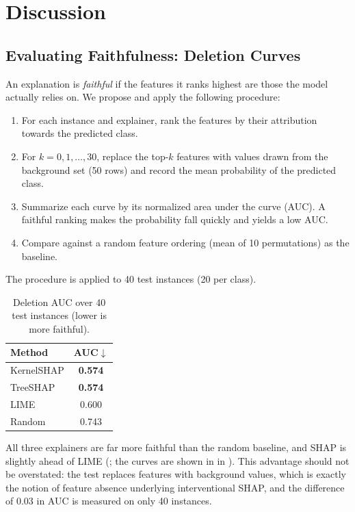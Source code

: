 \section{Discussion}
\label{sec:critical-analysis}

\subsection{Evaluating Faithfulness: Deletion Curves}
\label{sec:faithfulness}

An explanation is \textit{faithful} if the features it ranks highest are those the model actually relies on. We propose and apply the following procedure:
\begin{enumerate}
    \item For each instance and explainer, rank the features by their attribution towards the predicted class.
    \item For $k = 0, 1, \dots, 30$, replace the top-$k$ features with values drawn from the background set (50 rows) and record the mean probability of the predicted class.
    \item Summarize each curve by its normalized area under the curve (AUC). A faithful ranking makes the probability fall quickly and yields a low AUC.
    \item Compare against a random feature ordering (mean of 10 permutations) as the baseline.
\end{enumerate}
The procedure is applied to 40 test instances (20 per class).

\begin{table}[htbp]
    \centering
    \footnotesize
    \caption{Deletion AUC over 40 test instances (lower is more faithful).}
    \label{tab:deletion}
    \begin{tabular}{@{}lc@{}}
        \toprule
        Method & AUC$\downarrow$ \\
        \midrule
        KernelSHAP & \textbf{0.574} \\
        TreeSHAP & \textbf{0.574} \\
        LIME & 0.600 \\
        Random & 0.743 \\
        \bottomrule
    \end{tabular}
\end{table}

All three explainers are far more faithful than the random baseline, and SHAP is slightly ahead of LIME (; the curves are shown in  in ). This advantage should not be overstated: the test replaces features with background values, which is exactly the notion of feature absence underlying interventional SHAP, and the difference of 0.03 in AUC is measured on only 40 instances.

